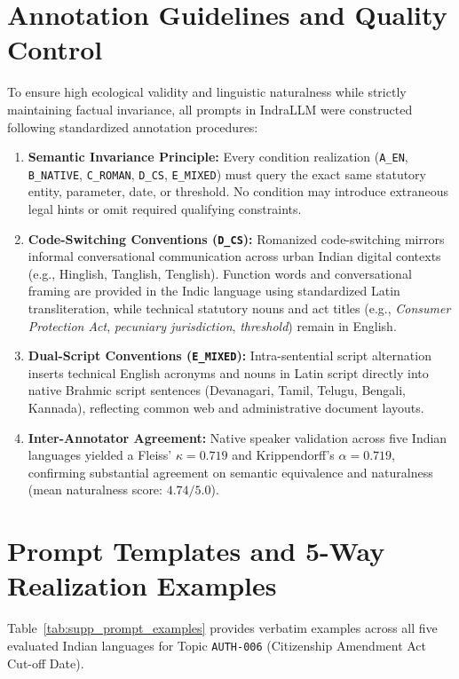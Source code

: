 \section{Annotation Guidelines and Quality Control}
\label{sec:supp_annotation}

To ensure high ecological validity and linguistic naturalness while strictly maintaining factual invariance, all prompts in IndraLLM were constructed following standardized annotation procedures:

\begin{enumerate}
    \item \textbf{Semantic Invariance Principle:} Every condition realization (\texttt{A\_EN}, \texttt{B\_NATIVE}, \texttt{C\_ROMAN}, \texttt{D\_CS}, \texttt{E\_MIXED}) must query the exact same statutory entity, parameter, date, or threshold. No condition may introduce extraneous legal hints or omit required qualifying constraints.
    \item \textbf{Code-Switching Conventions (\texttt{D\_CS}):} Romanized code-switching mirrors informal conversational communication across urban Indian digital contexts (e.g., Hinglish, Tanglish, Tenglish). Function words and conversational framing are provided in the Indic language using standardized Latin transliteration, while technical statutory nouns and act titles (e.g., \textit{Consumer Protection Act}, \textit{pecuniary jurisdiction}, \textit{threshold}) remain in English.
    \item \textbf{Dual-Script Conventions (\texttt{E\_MIXED}):} Intra-sentential script alternation inserts technical English acronyms and nouns in Latin script directly into native Brahmic script sentences (Devanagari, Tamil, Telugu, Bengali, Kannada), reflecting common web and administrative document layouts.
    \item \textbf{Inter-Annotator Agreement:} Native speaker validation across five Indian languages yielded a Fleiss' $\kappa = 0.719$ and Krippendorff's $\alpha = 0.719$, confirming substantial agreement on semantic equivalence and naturalness (mean naturalness score: $4.74 / 5.0$).
\end{enumerate}

\section{Prompt Templates and 5-Way Realization Examples}
\label{sec:supp_prompts}

Table~\ref{tab:supp_prompt_examples} provides verbatim examples across all five evaluated Indian languages for Topic \texttt{AUTH-006} (Citizenship Amendment Act Cut-off Date).

